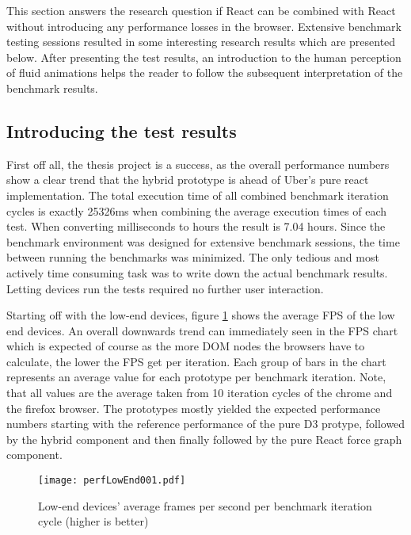 This section answers the research question if React can be combined with React without introducing any performance losses in the browser. Extensive benchmark testing sessions resulted in some interesting research results which are presented below. After presenting the test results, an introduction to the human perception of fluid animations helps the reader to follow the subsequent interpretation of the benchmark results.

\subsection{Introducing the test results}

First off all, the thesis project is a success, as the overall performance numbers show a clear trend that the hybrid prototype is ahead of Uber's pure react implementation. The total execution time of all combined benchmark iteration cycles is exactly 25326ms when combining the average execution times of each test. When converting milliseconds to hours the result is 7.04 hours. Since the benchmark environment was designed for extensive benchmark sessions, the time between running the benchmarks was minimized. The only tedious and most actively time consuming task was to write down the actual benchmark results. Letting devices run the tests required no further user interaction. 

Starting off with the low-end devices, figure \ref{fig:perfLowEnd001} shows the average FPS of the low end devices. An overall downwards trend can immediately seen in the FPS chart which is expected of course as the more DOM nodes the browsers have to calculate, the lower the FPS get per iteration. Each group of bars in the chart represents an average value for each prototype per benchmark iteration. Note, that all values are the average taken from 10 iteration cycles of the chrome and the firefox browser. The prototypes mostly yielded the expected performance numbers starting with the reference performance of the pure D3 protype, followed by the hybrid component and then finally followed by the pure React force graph component.

\begin{figure}
\centering
\texttt{[image: perfLowEnd001.pdf]}
\caption{Low-end devices' average frames per second per benchmark iteration cycle (higher is better)}
\label{fig:perfLowEnd001}
\end{figure}


